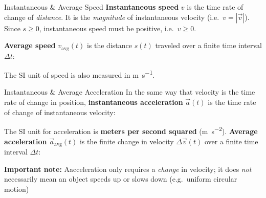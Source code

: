 \documentclass[12pt,compress,aspectratio=169,dvipsnames]{beamer}
\begin{document}
\begin{frame}{Instantaneous \& Average Speed}
  \textbf{Instantaneous speed} $v$ is the time rate of change of
  \emph{distance}. It is the \emph{magnitude} of instantaneous velocity
  (i.e.\ $v=|\vec v|$). Since $s\geq 0$, instantaneous speed must be positive,
  i.e.\ $v\geq 0$.


  \textbf{Average speed} $v_\text{avg}(t)$ is the distance $s(t)$ traveled over
  a finite time interval $\Delta t$:
  

  The SI unit of speed is also measured in \si{\metre\per\second}.
\end{frame}





\begin{frame}{Instantaneous \& Average Acceleration}
  In the same way that velocity is the time rate of change in position,
  \textbf{instantaneous acceleration} $\vec a(t)$ is the time rate of change of
  instantaneous velocity:


  The SI unit for acceleration is \textbf{meters per second squared}
  (\si{\metre\per\second\squared}). \textbf{Average acceleration}
  $\vec a_\text{avg}(t)$ is the finite change in velocity $\Delta\vec v(t)$ over
  a finite time interval $\Delta t$:


  \textbf{Important note:} Aacceleration only requires a \emph{change} in
  velocity; it does \emph{not} necessarily mean an object speeds up or slows
  down (e.g.\ uniform circular motion)
\end{frame}
\end{document}
